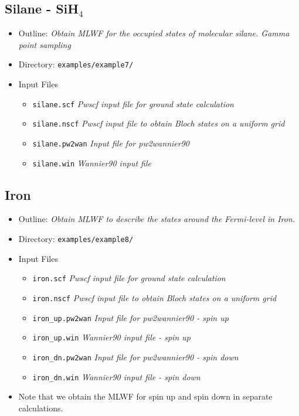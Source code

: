 \documentclass[a4paper,11pt,twoside]{article}
\begin{document}
\subsection*{Silane - SiH$_4$}
\begin{itemize}
\item{Outline: \it{Obtain MLWF for the occupied states of molecular silane. Gamma point sampling}}
\item{Directory: {\tt examples/example7/}}
\item{Input Files}
\begin{itemize}
\item{ {\tt silane.scf}  {\it Pwscf input file for ground state calculation}}
\item{ {\tt silane.nscf}  {\it Pwscf input file to obtain Bloch states on a uniform grid}}
\item{ {\tt silane.pw2wan}  {\it Input file for pw2wannier90}}
\item{ {\tt silane.win}  {\it Wannier90 input file}}
\end{itemize}
\end{itemize}


\subsection*{Iron}
\begin{itemize}
\item{Outline: \it{Obtain MLWF to describe the states around the Fermi-level in Iron.}}
\item{Directory: {\tt examples/example8/}}
\item{Input Files}
\begin{itemize}
\item{ {\tt iron.scf}  {\it Pwscf input file for ground state calculation}}
\item{ {\tt iron.nscf}  {\it Pwscf input file to obtain Bloch states on a uniform grid}}
\item{ {\tt iron\_up.pw2wan}  {\it Input file for pw2wannier90 - spin up}}
\item{ {\tt iron\_up.win}  {\it Wannier90 input file - spin up}}
\item{ {\tt iron\_dn.pw2wan}  {\it Input file for pw2wannier90 - spin down}}
\item{ {\tt iron\_dn.win}  {\it Wannier90 input file - spin down}}
\end{itemize}
\item{Note that we obtain the MLWF for spin up and spin down in separate calculations.}
                                                                                                                                            
\end{itemize}
\end{document}

